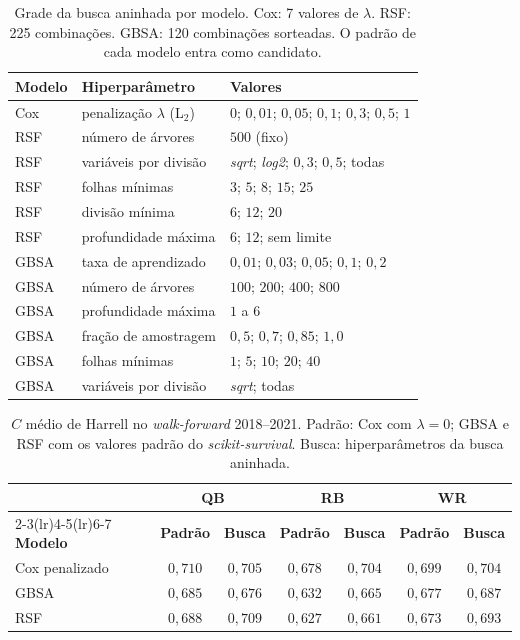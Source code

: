 \begin{table}[H]
\centering
\caption{Grade da busca aninhada por modelo. Cox: 7 valores de $\lambda$. RSF: 225 combinações. GBSA: 120 combinações sorteadas. O padrão de cada modelo entra como candidato.}
\label{tab:tgb_grade}
\thesistablesetup\footnotesize
\begin{tabular*}{\textwidth}{@{\extracolsep{\fill}}llp{}@{}}
\toprule
\textbf{Modelo} & \textbf{Hiperparâmetro} & \textbf{Valores} \\
\midrule
Cox & penalização $\lambda$ (L$_2$) & $0$; $0{,}01$; $0{,}05$; $0{,}1$; $0{,}3$; $0{,}5$; $1$ \\
\midrule
RSF & número de árvores & $500$ (fixo) \\
RSF & variáveis por divisão & \textit{sqrt}; \textit{log2}; $0{,}3$; $0{,}5$; todas \\
RSF & folhas mínimas & $3$; $5$; $8$; $15$; $25$ \\
RSF & divisão mínima & $6$; $12$; $20$ \\
RSF & profundidade máxima & $6$; $12$; sem limite \\
\midrule
GBSA & taxa de aprendizado & $0{,}01$; $0{,}03$; $0{,}05$; $0{,}1$; $0{,}2$ \\
GBSA & número de árvores & $100$; $200$; $400$; $800$ \\
GBSA & profundidade máxima & $1$ a $6$ \\
GBSA & fração de amostragem & $0{,}5$; $0{,}7$; $0{,}85$; $1{,}0$ \\
GBSA & folhas mínimas & $1$; $5$; $10$; $20$; $40$ \\
GBSA & variáveis por divisão & \textit{sqrt}; todas \\
\bottomrule
\end{tabular*}
\end{table}

\begin{table}[H]
\centering
\caption{$C$ médio de Harrell no \textit{walk-forward} 2018--2021. Padrão: Cox com $\lambda = 0$; GBSA e RSF com os valores padrão do \textit{scikit-survival}. Busca: hiperparâmetros da busca aninhada.}
\label{tab:tgb_padrao_busca}
\thesistablesetup
\footnotesize\setlength{\tabcolsep}{4pt}
\begin{tabular*}{\textwidth}{@{\extracolsep{\fill}}lcccccc@{}}
\toprule
& \multicolumn{2}{c}{\textbf{QB}} & \multicolumn{2}{c}{\textbf{RB}} & \multicolumn{2}{c}{\textbf{WR}} \\
\cmidrule(lr){2-3}\cmidrule(lr){4-5}\cmidrule(lr){6-7}
\textbf{Modelo} & \textbf{Padrão} & \textbf{Busca} & \textbf{Padrão} & \textbf{Busca} & \textbf{Padrão} & \textbf{Busca} \\
\midrule
Cox penalizado & $0{,}710$ & $0{,}705$ & $0{,}678$ & $0{,}704$ & $0{,}699$ & $0{,}704$ \\
GBSA & $0{,}685$ & $0{,}676$ & $0{,}632$ & $0{,}665$ & $0{,}677$ & $0{,}687$ \\
RSF & $0{,}688$ & $0{,}709$ & $0{,}627$ & $0{,}661$ & $0{,}673$ & $0{,}693$ \\
\bottomrule
\end{tabular*}
\end{table}

